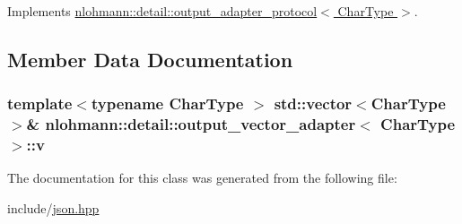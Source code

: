 Implements \hyperlink{structnlohmann_1_1detail_1_1output__adapter__protocol_a2f410a164e0eda17cf6561114b0eee4a}{nlohmann\+::detail\+::output\+\_\+adapter\+\_\+protocol$<$ Char\+Type $>$}.



\subsection{Member Data Documentation}
\subsubsection[{\texorpdfstring{v}{v}}]{\setlength{\rightskip}{0pt plus 5cm}template$<$typename Char\+Type $>$ std\+::vector$<$Char\+Type$>$\& {\bf nlohmann\+::detail\+::output\+\_\+vector\+\_\+adapter}$<$ Char\+Type $>$\+::v\hspace{0.3cm}{\ttfamily [private]}}\hypertarget{classnlohmann_1_1detail_1_1output__vector__adapter_a9b1ed9fba14e671ae1abb6692560ef3f}{}\label{classnlohmann_1_1detail_1_1output__vector__adapter_a9b1ed9fba14e671ae1abb6692560ef3f}


The documentation for this class was generated from the following file\+:\begin{DoxyCompactItemize}
\item 
include/\hyperlink{json_8hpp}{json.\+hpp}\end{DoxyCompactItemize}

